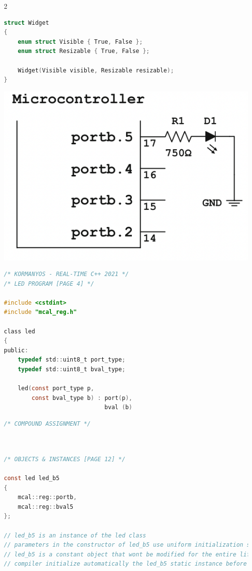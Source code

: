 \documentclass[8pt]{extarticle}
\begin{document}
\begin{small}
\begin{multicols}{2}
\begin{lstlisting}[language=C]
struct Widget
{
	enum struct Visible { True, False };
	enum struct Resizable { True, False };
	
	Widget(Visible visible, Resizable resizable);
}	
\end{lstlisting}


\includegraphics[scale=0.3]{mcontroller}

\begin{lstlisting}[language=C]
/* KORMANYOS - REAL-TIME C++ 2021 */
/* LED PROGRAM [PAGE 4] */

#include <cstdint>
#include "mcal_reg.h"

class led
{
public:
	typedef std::uint8_t port_type;
	typedef std::uint8_t bval_type;
	
	led(const port_type p,
		const bval_type b) : port(p),
							 bval (b)
\end{lstlisting}

\begin{lstlisting}[language=C]
/* COMPOUND ASSIGNMENT */

	
\end{lstlisting}



\begin{lstlisting}[language=C]
/* OBJECTS & INSTANCES [PAGE 12] */

const led led_b5
{
	mcal::reg::portb,
	mcal::reg::bval5
};

// led_b5 is an instance of the led class
// parameters in the constructor of led_b5 use uniform initialization syntax
// led_b5 is a constant object that wont be modified for the entire lifetime of the program
// compiler initialize automatically the led_b5 static instance before would be used in main() - this called startup code
\end{lstlisting}




\end{multicols}
\end{small}
\end{document}
